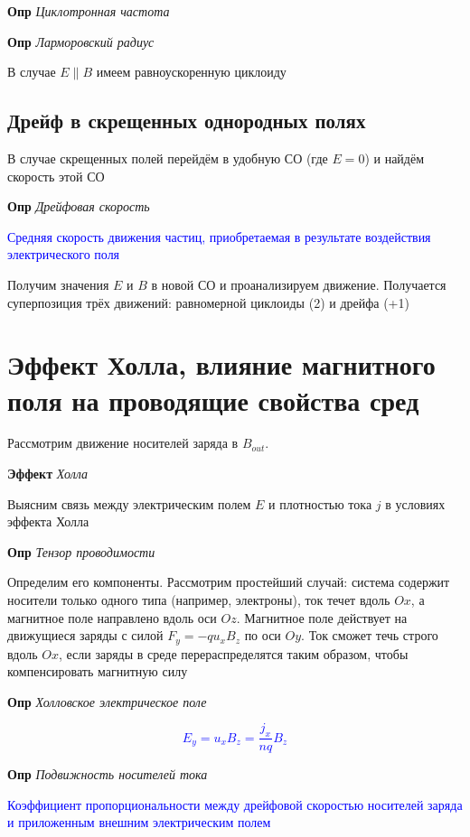 \documentclass[a4paper, 14pt]{article}
\begin{document}
    \textbf{Опр} \textit{Циклотронная частота}
    
    \textbf{Опр} \textit{Ларморовский радиус}
    
    В случае $E \| B$ имеем равноускоренную циклоиду
    
    \subsection{Дрейф в скрещенных однородных полях}
    
    В случае скрещенных полей перейдём в удобную СО (где $E = 0$) и найдём скорость этой СО
    
    \textbf{Опр} \textit{Дрейфовая скорость}
    
    \textcolor{blue}{Средняя скорость движения частиц, приобретаемая в результате воздействия электрического поля}
    
    Получим значения $E$ и $B$ в новой СО и проанализируем движение.
    Получается суперпозиция трёх движений: равномерной циклоиды (2) и дрейфа (+1)
    
    \section{Эффект Холла, влияние магнитного поля на проводящие свойства сред}
    
    Рассмотрим движение носителей заряда в $B_{out}$.
    
    \textbf{Эффект} \textit{Холла}
    
    Выясним связь между электрическим полем $E$ и плотностью тока $j$ в условиях эффекта Холла
    
    \textbf{Опр} \textit{Тензор проводимости}
    
    Определим его компоненты.
    Рассмотрим простейший случай: система содержит носители только одного типа (например, электроны), ток течет вдоль
    $Ox$, а магнитное поле направлено вдоль оси $Oz$.
    Магнитное поле действует на движущиеся заряды с силой $F_y = -q u_x B_z$ по оси $Oy$.
    Ток сможет течь строго вдоль $Ox$, если заряды в среде перераспределятся таким образом, чтобы компенсировать
    магнитную силу
    
    \textbf{Опр} \textit{Холловское электрическое поле}
    
    \textcolor{blue}{\[ E_y = u_x B_z = \frac{j_x}{nq} B_z \]}
    
    \textbf{Опр} \textit{Подвижность носителей тока}
    
    \textcolor{blue}{Коэффициент пропорциональности между дрейфовой скоростью носителей заряда и приложенным внешним
    электрическим полем}
    
\end{document}
